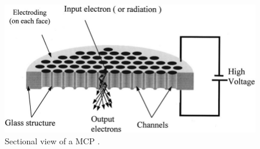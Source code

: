 \begin{figure}[!ht]
	\begin{center}
		\includegraphics[width=\textwidth]{03_Prototype/figures/fig031_MCP_outline}
	\end{center}
	\caption[]{Sectional view of a MCP \cite{Yi2001}.}
	\label{chap3:MCP_outline_1}
\end{figure}
